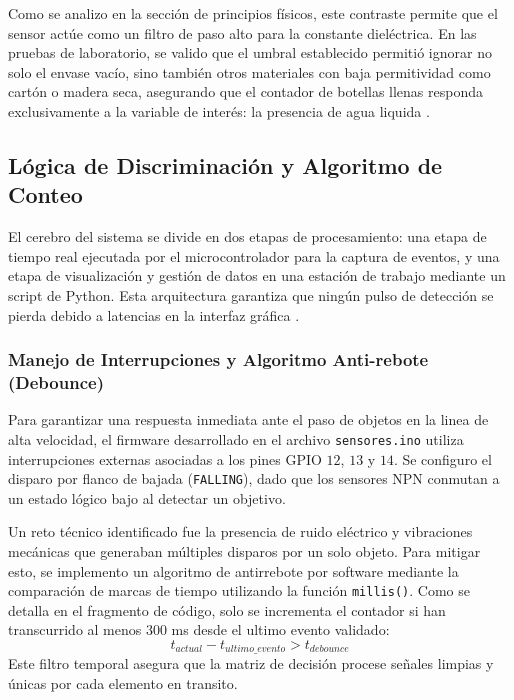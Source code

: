 \documentclass[conference]{IEEEtran}
\begin{document}
Como se analizo en la sección de principios físicos, este contraste permite que el sensor actúe como un filtro de paso alto para la constante dieléctrica. En las pruebas de laboratorio, se valido que el umbral establecido permitió ignorar no solo el envase vacío, sino también otros materiales con baja permitividad como cartón o madera seca, asegurando que el contador de botellas llenas responda exclusivamente a la variable de interés: la presencia de agua liquida \cite{sensores_20}.

\subsection{Lógica de Discriminación y Algoritmo de Conteo}

El cerebro del sistema se divide en dos etapas de procesamiento: una etapa de tiempo real ejecutada por el microcontrolador para la captura de eventos, y una etapa de visualización y gestión de datos en una estación de trabajo mediante un script de Python. Esta arquitectura garantiza que ningún pulso de detección se pierda debido a latencias en la interfaz gráfica \cite{sensores_14}.

\subsubsection{Manejo de Interrupciones y Algoritmo Anti-rebote (Debounce)}
Para garantizar una respuesta inmediata ante el paso de objetos en la linea de alta velocidad, el firmware desarrollado en el archivo \texttt{sensores.ino} utiliza interrupciones externas asociadas a los pines GPIO $12$, $13$ y $14$. Se configuro el disparo por flanco de bajada (\texttt{FALLING}), dado que los sensores NPN conmutan a un estado lógico bajo al detectar un objetivo.

Un reto técnico identificado fue la presencia de ruido eléctrico y vibraciones mecánicas que generaban múltiples disparos por un solo objeto. Para mitigar esto, se implemento un algoritmo de antirrebote por software mediante la comparación de marcas de tiempo utilizando la función \texttt{millis()}. Como se detalla en el fragmento de código, solo se incrementa el contador si han transcurrido al menos $300$ ms desde el ultimo evento validado:
\begin{equation}
    t_{actual} - t_{ultimo\_evento} > t_{debounce}
\end{equation}
Este filtro temporal asegura que la matriz de decisión procese señales limpias y únicas por cada elemento en transito.
\end{document}
